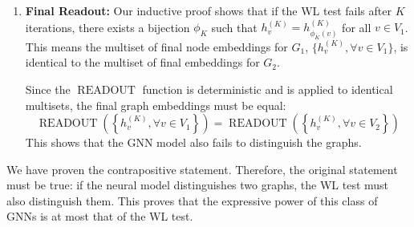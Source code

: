 \documentclass{article}
\numberwithin{figure}{section}
\begin{document}
{\begin{enumerate}
\begin{itemize}
				\item \textbf{Inductive Step:} Let $v \in V_1$. From our initial assumption, there exists a node $w = \phi_k(v) \in V_2$ such that $c_v^{(k)} = c_w^{(k)}$. The WL update rule is $c_v^{(k)} = \text{HASH}(c_v^{(k-1)}, \{c_u^{(k-1)} \mid u \in \mathcal{N}(v)\})$. Since the hashes are equal and we assume no collisions, their arguments must be identical. This implies two facts:
				\begin{enumerate}[(i)]
					\item $c_v^{(k-1)} = c_w^{(k-1)}$
					\item The multiset of neighbor colors is identical: $\{c_u^{(k-1)} \mid u \in \mathcal{N}(v)\} = \{c_z^{(k-1)} \mid z \in \mathcal{N}(w)\}$
				\end{enumerate}
				Now, by our Inductive Hypothesis, these facts about colors imply facts about embeddings:
				\begin{itemize}
					\item From (i): $h_v^{(k-1)} = h_w^{(k-1)}$.
					\item From (ii): The multisets of neighbor embeddings are also identical: $\{h_u^{(k-1)} \mid u \in \mathcal{N}(v)\} = \{h_z^{(k-1)} \mid z \in \mathcal{N}(w)\}$.
				\end{itemize}
				The GNN updates the embedding for $v$ as $h_v^{(k)} = \operatorname{COMBINE}(h_v^{(k-1)}, \operatorname{AGGREGATE}(\{h_u^{(k-1)}\}))$. Since the arguments to the deterministic functions $\operatorname{AGGREGATE}$ and $\operatorname{COMBINE}$ are identical for nodes $v$ and $w$, their outputs must be identical. Therefore, $h_v^{(k)} = h_w^{(k)}$. This completes the induction.
			\end{itemize}
			
			\item \textbf{Final Readout:}
			Our inductive proof shows that if the WL test fails after $K$ iterations, there exists a bijection $\phi_K$ such that $h_v^{(K)} = h_{\phi_K(v)}^{(K)}$ for all $v \in V_1$. This means the multiset of final node embeddings for $G_1$, $\{h_v^{(K)}, \forall v \in V_1\}$, is identical to the multiset of final embeddings for $G_2$.
			
			Since the $\operatorname{READOUT}$ function is deterministic and is applied to identical multisets, the final graph embeddings must be equal:
			\[ \operatorname{READOUT}\left(\left\{h_v^{(K)}, \forall v \in V_1\right\}\right) = \operatorname{READOUT}\left(\left\{h_v^{(K)}, \forall v \in V_2\right\}\right) \]
			This shows that the GNN model also fails to distinguish the graphs.
		\end{enumerate}
		
		We have proven the contrapositive statement. Therefore, the original statement must be true: if the neural model distinguishes two graphs, the WL test must also distinguish them. This proves that the expressive power of this class of GNNs is at most that of the WL test.
	}
	
	
\end{document}
